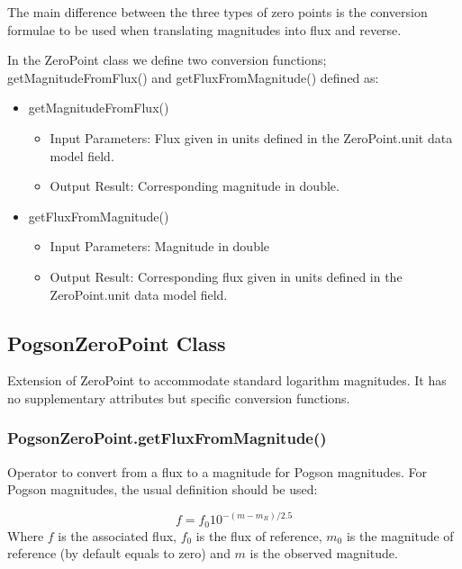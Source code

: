 \documentclass[11pt,a4paper]{ivoa}
\begin{document}

The main difference between the three types of zero points is the conversion formulae to be used when translating magnitudes into flux and reverse.\par

In the ZeroPoint class we define two conversion functions; getMagnitudeFromFlux() and getFluxFromMagnitude() defined as:\par

\begin{itemize}
	\item getMagnitudeFromFlux()\par

\begin{itemize}
	\item Input Parameters: Flux given in units defined in the ZeroPoint.unit data model field.\par

	\item Output Result: Corresponding magnitude in double.\par


\vspace{\baselineskip}

\end{itemize}
	\item  getFluxFromMagnitude()\par

\begin{itemize}
	\item Input Parameters: Magnitude in double\par

	\item Output Result: Corresponding flux given in units defined in the ZeroPoint.unit data model field.
\end{itemize}
\end{itemize}
\par


\subsection{PogsonZeroPoint Class}
Extension of ZeroPoint to accommodate standard logarithm magnitudes. It has no supplementary attributes but specific conversion functions.
\par

\subsubsection{PogsonZeroPoint.getFluxFromMagnitude()}
Operator to convert from a flux to a magnitude for Pogson magnitudes. For Pogson magnitudes, the usual definition should be used:
\par
\[
f = f_0 10^{-(m-m_R)/2.5}
\]
Where $f$ is the associated flux, $f_0$ is the flux of reference, $m_0$ is the magnitude of reference (by default equals to zero) and $m$ is the observed magnitude.
\par
\end{document}
